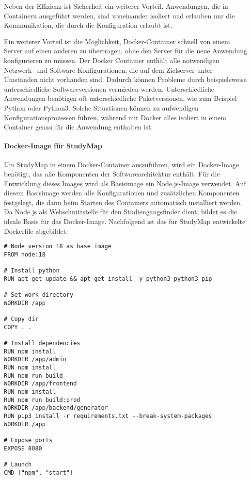 Neben der Effizienz ist Sicherheit ein weiterer Vorteil. Anwendungen, die in Containern ausgeführt werden, sind voneinander isoliert und erlauben nur die Kommunikation, die durch die Konfiguration erlaubt ist. \parencite{docker_inc_what_2024}

Ein weiterer Vorteil ist die Möglichkeit, Docker-Container schnell von einem Server auf einen anderen zu übertragen, ohne den Server für die neue Anwendung konfigurieren zu müssen. Der Docker Container enthält alle notwendigen Netzwerk- und Software-Konfigurationen, die auf dem Zielserver unter Umständen nicht vorhanden sind. Dadurch können Probleme durch beispielsweise unterschiedliche Softwareversionen vermieden werden. Unterschiedliche Anwendungen benötigen oft unterschiedliche Paketversionen, wie zum Beispiel Python oder Python3. Solche Situationen können zu aufwendigen Konfigurationsprozessen führen, während mit Docker alles isoliert in einem Container genau für die Anwendung enthalten ist. \parencite{amazon_web_services_inc_was_2023}

\paragraph*{Docker-Image für StudyMap}
Um StudyMap in einem Docker-Container auszuführen, wird ein Docker-Image benötigt, das alle Komponenten der Softwarearchitektur enthält. Für die Entwicklung dieses Images wird als Basisimage ein Node.js-Image verwendet. Auf diesem Basisimage werden alle Konfigurationen und zusätzlichen Komponenten festgelegt, die dann beim Starten des Containers automatisch installiert werden. Da Node.js als Webschnittstelle für den Studiengangsfinder dient, bildet es die ideale Basis für das Docker-Image. Nachfolgend ist das für StudyMap entwickelte Dockerfile abgebildet:

\noindent
\begin{minipage}{\linewidth}
\begin{lstlisting}[style=Python]
# Node version 18 as base image
FROM node:18

# Install python
RUN apt-get update && apt-get install -y python3 python3-pip

# Set work directory
WORKDIR /app

# Copy dir
COPY . .

# Install dependencies
RUN npm install
WORKDIR /app/admin
RUN npm install
RUN npm run build
WORKDIR /app/frontend
RUN npm install
RUN npm run build:prod
WORKDIR /app/backend/generator
RUN pip3 install -r requirements.txt --break-system-packages
WORKDIR /app

# Expose ports
EXPOSE 8080

# Launch
CMD ["npm", "start"]
\end{lstlisting}
\end{minipage}


